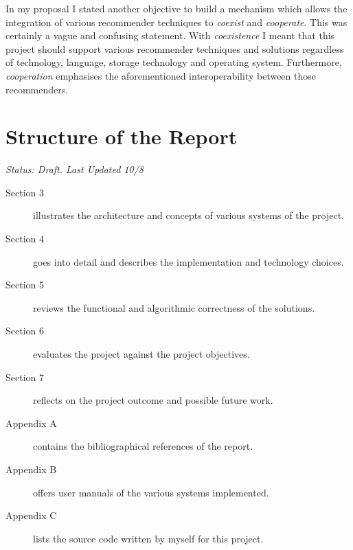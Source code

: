 In my proposal I stated another objective to build a mechanism which allows the integration of various recommender techniques to \emph{coexist} and \emph{cooperate}. This was certainly a vague and confusing statement. With \emph{coexistence} I meant that this project should support various recommender techniques and solutions regardless of technology, language, storage technology and operating system. Furthermore, \emph{cooperation} emphasises the aforementioned interoperability between those recommenders.

\section{Structure of the Report}

\emph{Status: Draft. Last Updated 10/8}

\begin{description}
    \item[Section 3] illustrates the architecture and concepts of various systems of the project.
    \item[Section 4] goes into detail and describes the implementation and technology choices.
    \item[Section 5] reviews the functional and algorithmic correctness of the solutions.
    \item[Section 6] evaluates the project against the project objectives.
    \item[Section 7] reflects on the project outcome and possible future work.
    \item[Appendix A] contains the bibliographical references of the report.
    \item[Appendix B] offers user manuals of the various systems implemented.
    \item[Appendix C] lists the source code written by myself for this project.
\end{description}